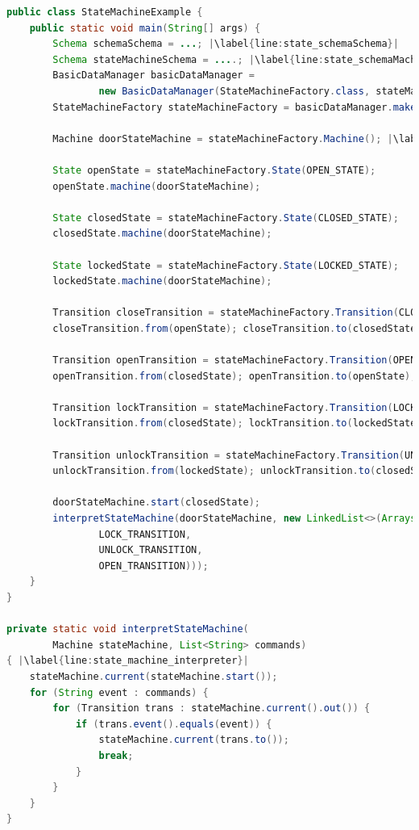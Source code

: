 \begin{sourcecode}
	\begin{lstlisting}[language=Java, escapechar=|]
public class StateMachineExample {
	public static void main(String[] args) {
		Schema schemaSchema = ...; |\label{line:state_schemaSchema}|
		Schema stateMachineSchema = ....; |\label{line:state_schemaMachineSchema}|
		BasicDataManager basicDataManager = 
				new BasicDataManager(StateMachineFactory.class, stateMachineSchema);  |\label{line:state_meaning_full_code}|
		StateMachineFactory stateMachineFactory = basicDataManager.make();

		Machine doorStateMachine = stateMachineFactory.Machine(); |\label{line:state_machine_creation_basic}|

		State openState = stateMachineFactory.State(OPEN_STATE);
		openState.machine(doorStateMachine);

		State closedState = stateMachineFactory.State(CLOSED_STATE);
		closedState.machine(doorStateMachine);

		State lockedState = stateMachineFactory.State(LOCKED_STATE);
		lockedState.machine(doorStateMachine);

		Transition closeTransition = stateMachineFactory.Transition(CLOSE_TRANSITION);
		closeTransition.from(openState); closeTransition.to(closedState);

		Transition openTransition = stateMachineFactory.Transition(OPEN_TRANSITION);
		openTransition.from(closedState); openTransition.to(openState);

		Transition lockTransition = stateMachineFactory.Transition(LOCK_TRANSITION);
		lockTransition.from(closedState); lockTransition.to(lockedState);

		Transition unlockTransition = stateMachineFactory.Transition(UNLOCK_TRANSITION);
		unlockTransition.from(lockedState); unlockTransition.to(closedState);

		doorStateMachine.start(closedState);
		interpretStateMachine(doorStateMachine, new LinkedList<>(Arrays.asList(
		        LOCK_TRANSITION,
		        UNLOCK_TRANSITION,
		        OPEN_TRANSITION)));
	}
}

private static void interpretStateMachine(
		Machine stateMachine, List<String> commands) 
{ |\label{line:state_machine_interpreter}|
    stateMachine.current(stateMachine.start());
    for (String event : commands) {
        for (Transition trans : stateMachine.current().out()) {
            if (trans.event().equals(event)) {
                stateMachine.current(trans.to());
                break;
            }
        }
    }
}   
	\end{lstlisting}
	\caption{Door state machine}
	\label{lst:Door_state_machine}
\end{sourcecode}

